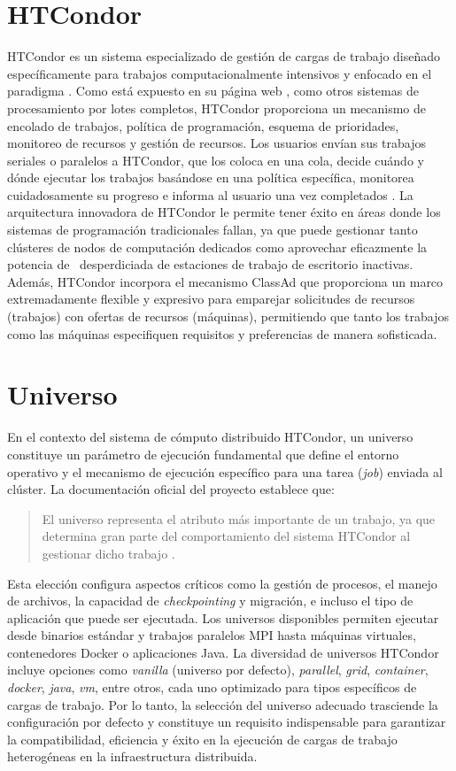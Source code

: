 \section{HTCondor}
HTCondor es un sistema especializado de gestión de cargas de trabajo diseñado específicamente para trabajos computacionalmente intensivos y enfocado en el paradigma \HTC. Como está expuesto en su página web \citep{HTCondor-what-is-HTCondor}, como otros sistemas de procesamiento por lotes completos, HTCondor proporciona un mecanismo de encolado de trabajos, política de programación, esquema de prioridades, monitoreo de recursos y gestión de recursos. Los usuarios envían sus trabajos seriales o paralelos a HTCondor, que los coloca en una cola, decide cuándo y dónde ejecutar los trabajos basándose en una política específica, monitorea cuidadosamente su progreso e informa al usuario una vez completados \citep{HTCondor-what-is-HTCondor}. La arquitectura innovadora de HTCondor le permite tener éxito en áreas donde los sistemas de programación tradicionales fallan, ya que puede gestionar tanto clústeres de nodos de computación dedicados como aprovechar eficazmente la potencia de \CPU~desperdiciada de estaciones de trabajo de escritorio inactivas. Además, HTCondor incorpora el mecanismo ClassAd que proporciona un marco extremadamente flexible y expresivo para emparejar solicitudes de recursos (trabajos) con ofertas de recursos (máquinas), permitiendo que tanto los trabajos como las máquinas especifiquen requisitos y preferencias de manera sofisticada.

\section{Universo}
\noindent
En el contexto del sistema de cómputo distribuido HTCondor, un universo constituye un parámetro de ejecución fundamental que define el entorno operativo y el mecanismo de ejecución específico para una tarea (\textit{job}) enviada al clúster. La documentación oficial del proyecto establece que:

\begin{quote}
	El universo representa el atributo más importante de un trabajo, ya que determina gran parte del comportamiento del sistema HTCondor al gestionar dicho trabajo \citep{HTCondor-what-is-a-job}.
\end{quote}

\noindent
Esta elección configura aspectos críticos como la gestión de procesos, el manejo de archivos, la capacidad de \textit{checkpointing} y migración, e incluso el tipo de aplicación que puede ser ejecutada. Los universos disponibles permiten ejecutar desde binarios estándar y trabajos paralelos MPI hasta máquinas virtuales, contenedores Docker o aplicaciones Java. La diversidad de universos HTCondor incluye opciones como \textit{vanilla} (universo por defecto), \textit{parallel}, \textit{grid}, \textit{container}, \textit{docker}, \textit{java}, \textit{vm}, entre otros, cada uno optimizado para tipos específicos de cargas de trabajo. Por lo tanto, la selección del universo adecuado trasciende la configuración por defecto y constituye un requisito indispensable para garantizar la compatibilidad, eficiencia y éxito en la ejecución de cargas de trabajo heterogéneas en la infraestructura distribuida.